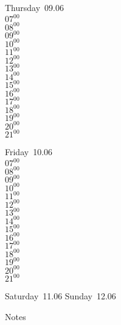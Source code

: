 \documentclass[11pt,a4paper]{book}\usepackage[]{graphicx}\usepackage[]{color}
\begin{document}
\clearpage
\begin{headerbox}
\end{headerbox}
\begin{weekdaybox}
  Thursday~09.06\\
  { 
  \vfill
  $07^{00}$\\
$08^{00}$\\
$09^{00}$\\
$10^{00}$\\
$11^{00}$\\
$12^{00}$\\
$13^{00}$\\
$14^{00}$\\
$15^{00}$\\
$16^{00}$\\
$17^{00}$\\
$18^{00}$\\
$19^{00}$\\
$20^{00}$\\
$21^{00}$\\
  }
\end{weekdaybox} 
\begin{weekdaybox}
  Friday~10.06\\
  { 
  \vfill
  $07^{00}$\\
$08^{00}$\\
$09^{00}$\\
$10^{00}$\\
$11^{00}$\\
$12^{00}$\\
$13^{00}$\\
$14^{00}$\\
$15^{00}$\\
$16^{00}$\\
$17^{00}$\\
$18^{00}$\\
$19^{00}$\\
$20^{00}$\\
$21^{00}$\\
  }
\end{weekdaybox}
\begin{weekendbox}
  Saturday~11.06
  \tcblower
  Sunday~12.06
\end{weekendbox} %
\begin{notebox}
  Notes
\end{notebox}
\clearpage
\end{document}
